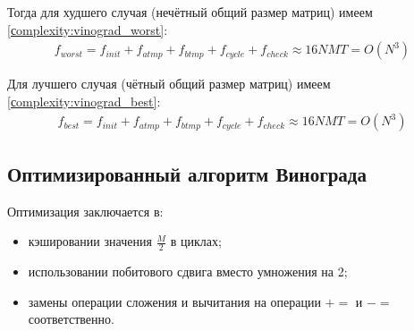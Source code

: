 Тогда для худшего случая (нечётный общий размер матриц) имеем \ref{сomplexity:vinograd_worst}:
\begin{equation}
	\label{сomplexity:vinograd_worst}
	\begin{aligned}
		f_{worst} = f_{init} + f_{atmp} + f_{btmp} + f_{cycle} + f_{check} \approx 16NMT = O(N^3)
	\end{aligned}
\end{equation}

Для лучшего случая (чётный общий размер матриц) имеем \ref{сomplexity:vinograd_best}:
\begin{equation}
	\label{сomplexity:vinograd_best}
	\begin{aligned}
		f_{best} = f_{init} + f_{atmp} + f_{btmp} + f_{cycle} + f_{check} \approx 16NMT = O(N^3)
	\end{aligned}
\end{equation}

\subsection{Оптимизированный алгоритм Винограда}

Оптимизация заключается в:
\begin{itemize}
	\item кэшировании значения $\frac{M}{2}$ в циклах;
	\item использовании побитового сдвига вместо умножения на 2;
	\item замены операции сложения и вычитания на операции $+=$ и $-=$ соответственно.
\end{itemize}

